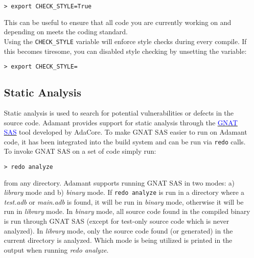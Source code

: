 \vspace{5mm} %
\begin{verbatim}
> export CHECK_STYLE=True
\end{verbatim}
\vspace{5mm} %

This can be useful to ensure that all code you are currently working on and depending on meets the coding standard. \\

Using the \texttt{CHECK\_STYLE} variable will enforce style checks during every compile. If this becomes tiresome, you can disabled style checking by unsetting the variable:

\vspace{5mm} %
\begin{verbatim}
> export CHECK_STYLE=
\end{verbatim}
\vspace{5mm} %

\subsection{Static Analysis} \label{Static Analysis}

Static analysis is used to search for potential vulnerabilities or defects in the source code. Adamant provides support for static analysis through the \href{https://www.adacore.com/static-analysis-suite}{\textcolor{blue}{GNAT SAS}} tool developed by AdaCore. To make GNAT SAS easier to run on Adamant code, it has been integrated into the build system and can be run via \texttt{redo} calls. \\

To invoke GNAT SAS on a set of code simply run:

\vspace{5mm} %
\begin{verbatim}
> redo analyze
\end{verbatim}
\vspace{5mm} %

from any directory. Adamant supports running GNAT SAS in two modes: a) \textit{library} mode and b) \textit{binary} mode. If \texttt{redo analyze} is run in a directory where a \textit{test.adb} or \textit{main.adb} is found, it will be run in \textit{binary} mode, otherwise it will be run in \textit{library} mode. In \textit{binary} mode, all source code found in the compiled binary is run through GNAT SAS (except for test-only source code which is never analyzed). In \textit{library} mode, only the source code found (or generated) in the current directory is analyzed. Which mode is being utilized is printed in the output when running \textit{redo analyze}. \\

